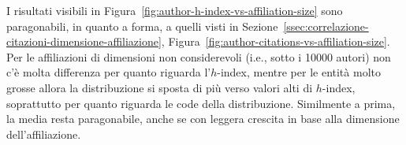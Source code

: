I risultati visibili in Figura~\ref{fig:author-h-index-vs-affiliation-size}
sono paragonabili, in quanto a forma, a quelli visti in
Sezione~\ref{ssec:correlazione-citazioni-dimensione-affiliazione},
Figura~\ref{fig:author-citations-vs-affiliation-size}.
Per le affiliazioni di dimensioni non considerevoli (i.e., sotto i 10000 autori)
non c'è molta differenza per quanto riguarda l'$h$-index, mentre per le entità
molto grosse allora la distribuzione si sposta di più verso valori alti di
$h$-index, soprattutto per quanto riguarda le code della distribuzione.
Similmente a prima, la media resta paragonabile, anche se con leggera crescita
in base alla dimensione dell'affiliazione.




